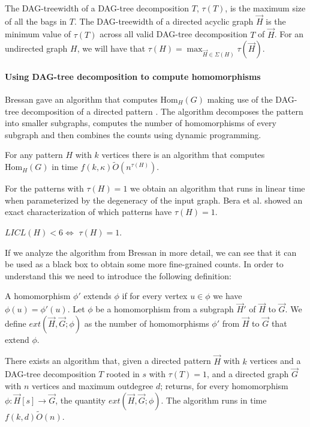 \documentclass[a4paper,UKenglish,cleveref, autoref, numberwithinsect, thm-restate]{lipics-v2021}
\newcommand{\extension}[3]{ext\left(#1,#2;#3\right)}
\newcommand{\Hom}[2]{\mathrm{Hom}_{#2}(#1)}
\newcommand{\degen}{\kappa}
\newcommand{\dtw}{\tau}
\newcommand{\dagtree}{DAG-tree decomposition}
\newcommand{\dagtreewidth}{DAG-treewidth}
\begin{document}
	The \dagtreewidth{} of a \dagtree{} $T$,  $\dtw(T)$, is the maximum size of all the bags in $T$. The \dagtreewidth{} of a directed acyclic graph $\vec{H}$ is the minimum value of $\dtw(T)$ across all valid \dagtree{} $T$ of $\vec{H}$. For an undirected graph $H$, we will have that $\dtw(H) = \max_{\vec{H} \in \Sigma(H)} \dtw(\vec{H})$.
	
	\paragraph*{Using \dagtree{} to compute homomorphisms}
	
	Bressan gave an algorithm that computes $\Hom{G}{H}$ making use of the \dagtree{} of a directed pattern \cite{Br19,Br21}. The algorithm decomposes the pattern into smaller subgraphs, computes the number of homomorphisms of every subgraph and then combines the counts using dynamic programming.
	\begin{theorem} \label{thm:bressan} \cite{Br19}
		For any pattern $H$ with $k$ vertices there is an algorithm that computes $\Hom{G}{H}$ in time $f(k, \degen) \tilde{O}(n^{\dtw(H)})$.
	\end{theorem}
	For the patterns with $\dtw(H) = 1$ we obtain an algorithm that runs in linear time when parameterized by the degeneracy of the input graph. Bera et al. showed an exact characterization of which patterns have $\dtw(H) = 1$.
	\begin{lemma} \label{lem:licl} \cite{BePaSe21}
		$LICL(H) < 6 \Leftrightarrow$ $\dtw(H) = 1$.
	\end{lemma}
	
	If we analyze the algorithm from Bressan in more detail, we can see that it can be used as a black box to obtain some more fine-grained counts. In order to understand this we need to introduce the following definition:
	
	A homomorphism $\phi'$ extends $\phi$ if for every vertex $u \in \phi$ we have $\phi(u) = \phi'(u)$. Let $\phi$ be a homomorphism from a subgraph $\vec{H}'$ of $\vec{H}$ to $\vec{G}$. We define $\extension{\vec{H}}{\vec{G}}{\phi}$ as the number of homomorphisms $\phi'$ from $\vec{H}$ to $\vec{G}$ that extend $\phi$.
	
	\begin{lemma}  There exists an algorithm that, given a directed pattern $\vec{H}$ with $k$ vertices and a \dagtree{} $T$ rooted in $s$ with $\dtw(T)=1$, and a directed graph $\vec{G}$ with $n$ vertices and maximum outdegree $d$; returns, for every homomorphism $\phi:\vec{H}[s] \to \vec{G}$, the quantity $\extension{\vec{H}}{\vec{G}}{\phi}$. The algorithm runs in time $f(k,d)\tilde{O}(n)$.
	\end{lemma}
	
\end{document}
